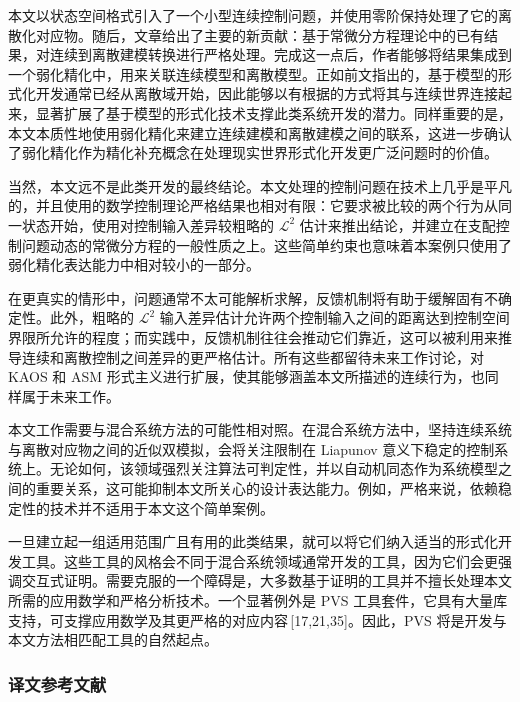 {\indent 本文以状态空间格式引入了一个小型连续控制问题，并使用零阶保持处理了它的离散化对应物。随后，文章给出了主要的新贡献：基于常微分方程理论中的已有结果，对连续到离散建模转换进行严格处理。完成这一点后，作者能够将结果集成到一个弱化精化中，用来关联连续模型和离散模型。正如前文指出的，基于模型的形式化开发通常已经从离散域开始，因此能够以有根据的方式将其与连续世界连接起来，显著扩展了基于模型的形式化技术支撑此类系统开发的潜力。同样重要的是，本文本质性地使用弱化精化来建立连续建模和离散建模之间的联系，这进一步确认了弱化精化作为精化补充概念在处理现实世界形式化开发更广泛问题时的价值。

\indent 当然，本文远不是此类开发的最终结论。本文处理的控制问题在技术上几乎是平凡的，并且使用的数学控制理论严格结果也相对有限：它要求被比较的两个行为从同一状态开始，使用对控制输入差异较粗略的 $\mathcal{L}^{2}$ 估计来推出结论，并建立在支配控制问题动态的常微分方程的一般性质之上。这些简单约束也意味着本案例只使用了弱化精化表达能力中相对较小的一部分。

\indent 在更真实的情形中，问题通常不太可能解析求解，反馈机制将有助于缓解固有不确定性。此外，粗略的 $\mathcal{L}^{2}$ 输入差异估计允许两个控制输入之间的距离达到控制空间界限所允许的程度；而实践中，反馈机制往往会推动它们靠近，这可以被利用来推导连续和离散控制之间差异的更严格估计。所有这些都留待未来工作讨论，对 KAOS 和 ASM 形式主义进行扩展，使其能够涵盖本文所描述的连续行为，也同样属于未来工作。

\indent 本文工作需要与混合系统方法的可能性相对照。在混合系统方法中，坚持连续系统与离散对应物之间的近似双模拟，会将关注限制在 Liapunov 意义下稳定的控制系统上。无论如何，该领域强烈关注算法可判定性，并以自动机同态作为系统模型之间的重要关系，这可能抑制本文所关心的设计表达能力。例如，严格来说，依赖稳定性的技术并不适用于本文这个简单案例。

\indent 一旦建立起一组适用范围广且有用的此类结果，就可以将它们纳入适当的形式化开发工具。这些工具的风格会不同于混合系统领域通常开发的工具，因为它们会更强调交互式证明。需要克服的一个障碍是，大多数基于证明的工具并不擅长处理本文所需的应用数学和严格分析技术。一个显著例外是 PVS 工具套件，它具有大量库支持，可支撑应用数学及其更严格的对应内容\,[17,21,35]。因此，PVS 将是开发与本文方法相匹配工具的自然起点。

\subsubsection*{译文参考文献}

}
